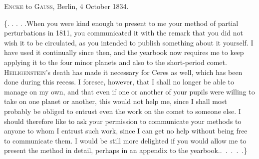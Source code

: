 \par{}\bigskip
\begin{center}
\textsc{Encke} to \textsc{Gauss}, Berlin, 4 October 1834.
\end{center}
\noindent\hspace*{\parindent}\{. . . . .\quad When you were kind enough to present to me your method of partial perturbations in 1811, you communicated it with the remark that you did not wish it to be circulated, as you intended to publish something about it yourself. I have used it continually since then, and the yearbook now requires me to keep applying it to the four minor planets and also to the short-period comet. \textsc{Heiligenstein}'s death has made it necessary for Ceres as well, which has been done during this recess. I foresee, however, that I shall no longer be able to manage on my own, and that even if one or another of your pupils were willing to take on one planet or another, this would not help me, since I shall most probably be obliged to entrust even the work on the comet to someone else. I should therefore like to ask your permission to communicate your methods to anyone to whom I entrust such work, since I can get no help without being free to communicate them. I would be still more delighted if you would allow me to present the method in detail, perhaps in an appendix to the yearbook.\quad\mbox{. . . . .\}}
\par
